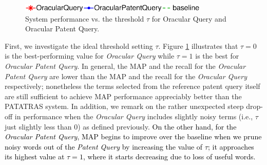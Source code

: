 \begin{figure}[t!]
\begin{centering}
\includegraphics[width=9cm]{imgs/l1}
\par\end{centering}

\begin{centering}
\par\end{centering}

\protect\caption{System performance vs. the threshold $\tau$ for Oracular Query and Oracular Patent Query.}
\label{fig:oracular}
\end{figure}

First, we investigate the ideal threshold setting $\tau$.
Figure \ref{fig:oracular} illustrates that $\tau=0$ is the
best-performing value for \emph{Oracular Query} while $\tau=1$ is the
best for \emph{Oracular Patent Query}. In general, the MAP and the recall for the \emph{Oracular
Patent Query} are lower than the MAP and the recall for the \emph{Oracular Query} respectively;
nonetheless the terms selected from the reference patent query itself are
still sufficient to achieve MAP performance appreciably better than the PATATRAS system. In addition, we remark on the rather
unexpected steep drop-off in performance when the \emph{Oracular Query}
includes slightly noisy terms (i.e., $\tau$ just slightly less than 0)
as defined previously. \textcolor{black}{On the other hand, for the \emph{Oracular Patent Query}, 
MAP begins to improve over the baseline when we prune noisy words out of the \emph{Patent Query} by increasing the value of $\tau$; it approaches its highest value at $\tau=1$, where it starts decreasing due to loss of useful words.}


